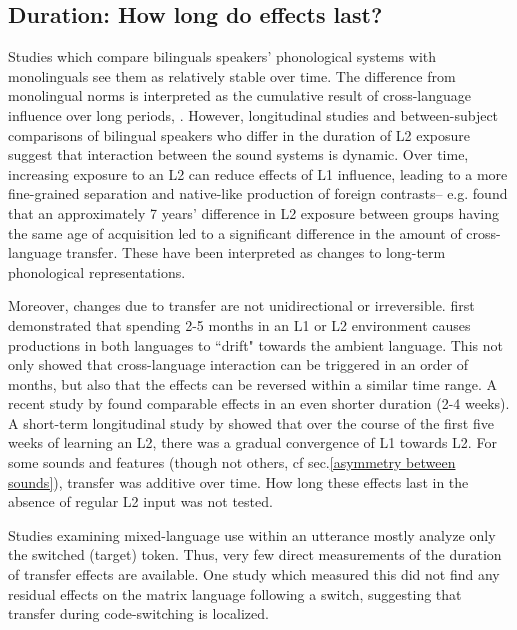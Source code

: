 \documentclass[charis,linguex]{glossa}
\begin{document}
\subsection{Duration: How long do effects last?} \label{duration}

Studies which compare bilinguals speakers' phonological systems with monolinguals see them as relatively stable over time. The difference from monolingual norms is interpreted as the cumulative result of cross-language influence over long periods, \cite{guion2003vowel, caramazza1973acquisition}. However, longitudinal studies %
and between-subject comparisons of bilingual speakers who differ in the duration of L2 exposure suggest that interaction between the sound systems is dynamic. Over time, increasing exposure to an L2 can reduce effects of L1 influence, leading to a more fine-grained separation and native-like production of foreign contrasts-- e.g. \cite{bohn1992production} 
found that an approximately 7 years' difference in L2 exposure between groups having the same age of acquisition led to a significant difference in the amount of cross-language transfer. These have been interpreted as changes to long-term phonological representations.

Moreover, changes due to transfer are not unidirectional or irreversible. \cite{sancier1997gestural} first demonstrated that spending 2-5 months in an L1 or L2 environment causes productions in both languages to ``drift" towards the ambient language. This not only showed that cross-language interaction can be triggered in an order of months, but also that the effects can be reversed within a similar time range. A recent study by \cite{tobin2017phonetic} found comparable effects in an even shorter duration (2-4 weeks). A short-term longitudinal study by \cite{chang2012rapid} showed that over the course of the first five weeks of learning an L2, there was a gradual convergence of L1 towards L2. For some sounds and features (though not others, cf sec.\ref{asymmetry between sounds}), transfer was additive over time. How long these effects last in the absence of regular L2 input was not tested. 

Studies examining mixed-language use within an utterance mostly analyze only the switched (target) token. Thus, very few direct measurements of the duration of transfer effects are available. One study which measured this \citep{bullock2009trying} did not find any residual effects on the matrix language following a switch, suggesting that transfer during code-switching is localized.  
\end{document}
